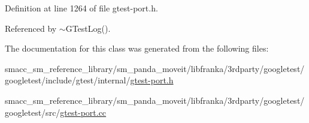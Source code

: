 Definition at line 1264 of file gtest-\/port.\+h.



Referenced by $\sim$\+G\+Test\+Log().



The documentation for this class was generated from the following files\+:\begin{DoxyCompactItemize}
\item 
smacc\+\_\+sm\+\_\+reference\+\_\+library/sm\+\_\+panda\+\_\+moveit/libfranka/3rdparty/googletest/googletest/include/gtest/internal/\hyperlink{gtest-port_8h}{gtest-\/port.\+h}\item 
smacc\+\_\+sm\+\_\+reference\+\_\+library/sm\+\_\+panda\+\_\+moveit/libfranka/3rdparty/googletest/googletest/src/\hyperlink{gtest-port_8cc}{gtest-\/port.\+cc}\end{DoxyCompactItemize}

